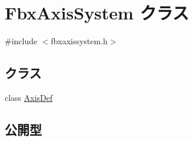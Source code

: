 \hypertarget{class_fbx_axis_system}{}\section{Fbx\+Axis\+System クラス}
\label{class_fbx_axis_system}


{\ttfamily \#include $<$fbxaxissystem.\+h$>$}

\subsection*{クラス}
\begin{DoxyCompactItemize}
\item 
class \hyperlink{class_fbx_axis_system_1_1_axis_def}{Axis\+Def}
\end{DoxyCompactItemize}
\subsection*{公開型}
